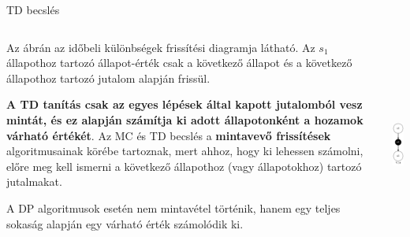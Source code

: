 \documentclass[english, aspectratio=169]{beamer}
\begin{document}
\begin{frame}{TD becslés}
\begin{columns}
\begin{column}{.7\textwidth}
Az ábrán az időbeli különbségek frissítési diagramja látható. Az $s_1$ állapothoz tartozó állapot-érték csak a következő állapot és a következő állapothoz tartozó jutalom alapján frissül. \par\smallskip
\textbf{A TD tanítás csak az egyes lépések által kapott jutalomból vesz mintát, és ez alapján számítja ki adott állapotonként a hozamok várható értékét}. Az MC és TD becslés a \textbf{mintavevő frissítések} algoritmusainak körébe tartoznak, mert ahhoz, hogy ki lehessen számolni, előre meg kell ismerni a következő állapothoz (vagy állapotokhoz) tartozó jutalmakat.\par\smallskip
A DP algoritmusok esetén nem mintavétel történik, hanem egy teljes sokaság alapján egy várható érték számolódik ki.
\end{column}
\begin{column}{.3\textwidth}
\begin{center}
\includegraphics[height=7cm, keepaspectratio]{graphs/mc_td_4.png}
\end{center}
\end{column}
\end{columns}
\end{frame}
\end{document}
